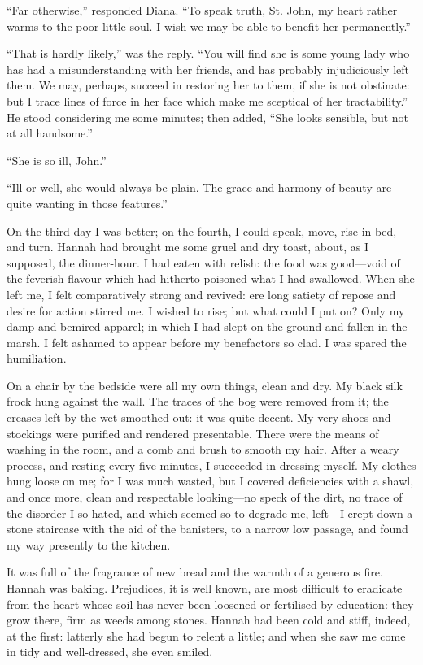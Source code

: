\enquote{Far otherwise,} responded Diana. \enquote{To speak truth, St.
John, my heart rather warms to the poor little soul. I wish we may be
able to benefit her permanently.}

\enquote{That is hardly likely,} was the reply. \enquote{You will find
she is some young lady who has had a misunderstanding with her friends,
and has probably injudiciously left them. We may, perhaps, succeed in
restoring her to them, if she is not obstinate: but I trace lines of
force in her face which make me sceptical of her tractability.} He
stood considering me some minutes; then added, \enquote{She looks
sensible, but not at all handsome.}

\enquote{She is so ill, \St{} John.}

\enquote{Ill or well, she would always be plain. The grace and harmony
of beauty are quite wanting in those features.}

On the third day I was better; on the fourth, I could speak, move, rise
in bed, and turn. Hannah had brought me some gruel and dry toast,
about, as I supposed, the dinner-hour. I had eaten with relish: the
food was good---void of the feverish flavour which had hitherto poisoned
what I had swallowed. When she left me, I felt comparatively strong and
revived: ere long satiety of repose and desire for action stirred me. I
wished to rise; but what could I put on? Only my damp and bemired
apparel; in which I had slept on the ground and fallen in the marsh. I
felt ashamed to appear before my benefactors so clad. I was spared the
humiliation.

On a chair by the bedside were all my own things, clean and dry. My
black silk frock hung against the wall. The traces of the bog were
removed from it; the creases left by the wet smoothed out: it was quite
decent. My very shoes and stockings were purified and rendered
presentable. There were the means of washing in the room, and a comb
and brush to smooth my hair. After a weary process, and resting every
five minutes, I succeeded in dressing myself. My clothes hung loose on
me; for I was much wasted, but I covered deficiencies with a shawl, and
once more, clean and respectable looking---no speck of the dirt, no
trace of the disorder I so hated, and which seemed so to degrade me,
left---I crept down a stone staircase with the aid of the banisters, to
a narrow low passage, and found my way presently to the kitchen.

It was full of the fragrance of new bread and the warmth of a generous
fire. Hannah was baking. Prejudices, it is well known, are most
difficult to eradicate from the heart whose soil has never been loosened
or fertilised by education: they grow there, firm as weeds among
stones. Hannah had been cold and stiff, indeed, at the first: latterly
she had begun to relent a little; and when she saw me come in tidy and
well-dressed, she even smiled.

